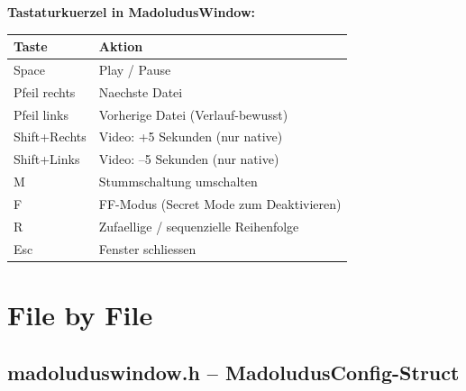 \textbf{Tastaturkuerzel in MadoludusWindow:}
\begin{center}
\small
\begin{tabular}{ll}
\toprule
\textbf{Taste} & \textbf{Aktion} \\
\midrule
Space         & Play / Pause \\
Pfeil rechts  & Naechste Datei \\
Pfeil links   & Vorherige Datei (Verlauf-bewusst) \\
Shift+Rechts  & Video: +5 Sekunden (nur native) \\
Shift+Links   & Video: --5 Sekunden (nur native) \\
M             & Stummschaltung umschalten \\
F             & FF-Modus (Secret Mode zum Deaktivieren) \\
R             & Zufaellige / sequenzielle Reihenfolge \\
Esc           & Fenster schliessen \\
\bottomrule
\end{tabular}
\end{center}

\section{File by File}

\subsection{madoluduswindow.h -- MadoludusConfig-Struct}

